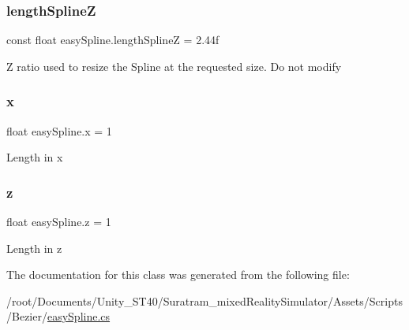 \mbox{\label{classeasySpline_ada978fd8ee35f377dd8a46d6b736bf90}} 
\subsubsection{\texorpdfstring{length\+SplineZ}{lengthSplineZ}}
{\footnotesize\ttfamily const float easy\+Spline.\+length\+SplineZ = 2.\+44f\hspace{0.3cm}{\ttfamily [private]}}



Z ratio used to resize the Spline at the requested size. Do not modify

\mbox{\label{classeasySpline_abb53dcde316e6ee14c45c1de1f033d4e}} 
\subsubsection{\texorpdfstring{x}{x}}
{\footnotesize\ttfamily float easy\+Spline.\+x = 1}



Length in x

\mbox{\label{classeasySpline_a45bbb109c803b738a7c3a60711d9dc88}} 
\subsubsection{\texorpdfstring{z}{z}}
{\footnotesize\ttfamily float easy\+Spline.\+z = 1}



Length in z



The documentation for this class was generated from the following file\+:\begin{DoxyCompactItemize}
\item 
/root/\+Documents/\+Unity\+\_\+\+S\+T40/\+Suratram\+\_\+mixed\+Reality\+Simulator/\+Assets/\+Scripts/\+Bezier/\hyperlink{easySpline_8cs}{easy\+Spline.\+cs}\end{DoxyCompactItemize}
